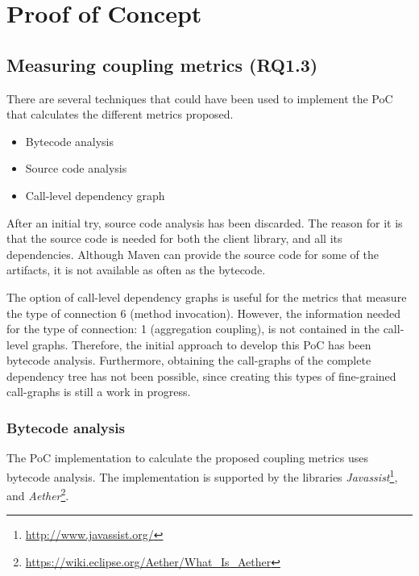 \chapter{Proof of Concept}\label{ch:PoC}


\section{Measuring coupling metrics (RQ1.3)}
There are several techniques that could have been used to implement the PoC that calculates the different metrics proposed.

\begin{itemize}
  \item Bytecode analysis
  \item Source code analysis
  \item Call-level dependency graph
\end{itemize}

After an initial try, source code analysis has been discarded. The reason for it is that the source code is needed for both the client library, and all its dependencies. Although Maven can provide the source code for some of the artifacts, it is not available as often as the bytecode.

The option of call-level dependency graphs is useful for the metrics that measure the type of connection 6 (method invocation). However, the information needed for the type of connection: 1 (aggregation coupling), is not contained in the call-level graphs. Therefore, the initial approach to develop this PoC has been bytecode analysis. Furthermore, obtaining the call-graphs of the complete dependency tree has not been possible, since creating this types of fine-grained call-graphs is still a work in progress.

\subsection{Bytecode analysis}
The PoC implementation to calculate the proposed coupling metrics uses bytecode analysis. The implementation is supported by the libraries \textit{Javassist}\footnote{\url{http://www.javassist.org/}}, and \textit{Aether}\footnote{\url{https://wiki.eclipse.org/Aether/What_Is_Aether}}.

